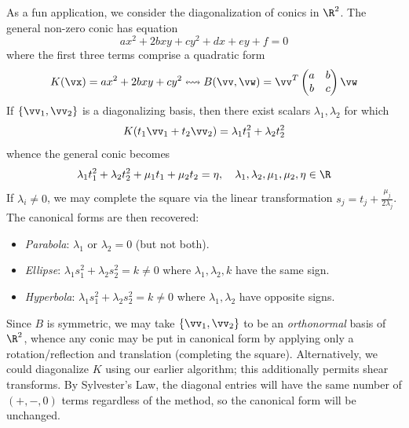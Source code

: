 As a fun application, we consider the diagonalization of conics in $\R^2$. The general non-zero conic has equation
\[ax^2+2bxy+cy^2+dx+ey+f=0\]
where the first three terms comprise a quadratic form
\[K(\vx)=ax^2+2bxy+cy^2\leftrightsquigarrow B(\vv,\vw)=\vv^T\begin{pmatrix}
a&b\\b&c
\end{pmatrix}\vw\]
If $\{\vv_1,\vv_2\}$ is a diagonalizing basis, then there exist scalars $\lambda_1,\lambda_2$ for which
\[K(t_1\vv_1+t_2\vv_2)=\lambda_1t_1^2+\lambda_2t_2^2\]
whence the general conic becomes
\[\lambda_1t_1^2+\lambda_2t_2^2+\mu_1t_1+\mu_2t_2=\eta,\quad \lambda_1,\lambda_2,\mu_1,\mu_2,\eta\in\R\]
If $\lambda_i\neq 0$, we may complete the square via the linear transformation $s_j=t_j+\frac{\mu_j}{2\lambda_j}$. The canonical forms are then recovered:
\begin{itemize}
	\item[]\normalfont\emph{Parabola}: $\lambda_1$ or $\lambda_2=0$ (but not both).
	\item[]\normalfont\emph{Ellipse}: $\lambda_1s_1^2+\lambda_2s_2^2=k\neq 0$ where $\lambda_1,\lambda_2,k$ have the same sign.
	\item[]\normalfont\emph{Hyperbola}: $\lambda_1s_1^2+\lambda_2s_2^2=k\neq 0$ where $\lambda_1,\lambda_2$ have opposite signs.
\end{itemize}
Since $B$ is symmetric, we may take $\{\vv_1,\vv_2\}$ to be an \emph{orthonormal} basis of $\R^2$, whence any conic may be put in canonical form by applying only a rotation/reflection and translation (completing the square).\smallbreak
Alternatively, we could diagonalize $K$ using our earlier algorithm; this additionally permits shear transforms. By Sylvester's Law, the diagonal entries will have the same number of $(+,-,0)$ terms regardless of the method, so the canonical form will be unchanged.


